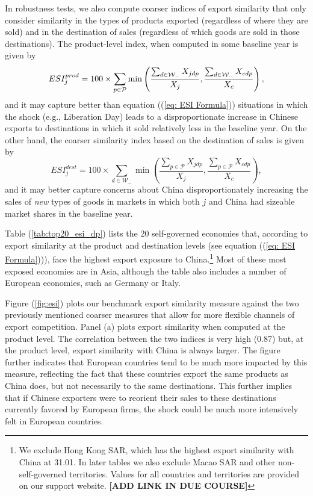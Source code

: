\documentclass[english,12pt]{article}
\theoremstyle{definition}
\let\oldref\ref
\renewcommand{\ref}[1]{(\oldref{#1})}
\begin{document}
In robustness tests, we also compute coarser indices of export similarity
that only consider similarity in the types of products exported (regardless
of where they are sold) and in the destination of sales (regardless of which
goods are sold in those destinations). The product-level index, when
computed in some baseline year is given by%
\begin{equation}
ESI_{j}^{prod}= 100 \times \sum_{p\in \mathcal{P}}\min \left( \frac{\sum_{d\in \mathcal{%
W}_{-}}X_{jdp}}{X_{j}},\frac{\sum_{d\in \mathcal{W}_{-}}X_{cdp}}{X_{c}}%
\right) ,  \label{eq: ESI Formula Product}
\end{equation}%
and it may capture better than equation (\ref{eq: ESI Formula}) situations
in which the shock (e.g., Liberation Day) leads to a disproportionate
increase in Chinese exports to destinations in which it sold relatively less
in the baseline year. On the other hand, the coarser similarity index based
on the destination of sales is given by 
\begin{equation}
ESI_{j}^{dest}= 100 \times \sum_{d\in \mathcal{W}_{-}}\min \left( \frac{\sum_{p\in 
\mathcal{P}}X_{jdp}}{X_{j}},\frac{\sum_{p\in \mathcal{P}}X_{cdp}}{X_{c}}%
\right),  \label{eq: ESI Formula Destination}
\end{equation}%
and it may better capture concerns about China disproportionately increasing
the sales of \emph{new} types of goods in markets in which both $j$ and China had
sizeable market shares in the baseline year.

Table \ref{tab:top20_esi_dp} lists the 20 self-governed economies that, according to
export similarity at the product and destination levels (see equation (\ref%
{eq: ESI Formula})), face the highest export exposure to China.\footnote{We
exclude Hong Kong SAR, which has the highest export similarity with China at 31.01. In
later tables we also exclude Macao SAR and other non-self-governed territories.
Values for all countries and territories are provided on our support website. \textbf{[ADD 
LINK IN DUE COURSE]}} Most of
these most exposed economies are in Asia, although the table also includes a
number of European economies, such as Germany or Italy.

\begin{table}[htbp]
\caption{Top 20 economies by Export Similarity ($ESI_{j}$)}
\label{tab:top20_esi_dp}\centering

\end{table}

Figure \ref{fig:esi} plots our benchmark export similarity measure against
the two previously mentioned coarser measures that allow for more flexible channels of export
competition. Panel (a) plots export similarity when computed at the product
level. The correlation between the two indices is very high (0.87) but, at
the product level, export similarity with China is always larger. The
figure further indicates that European countries tend to be much more
impacted by this measure, reflecting the fact that these countries export
the same products as China does, but not necessarily to the same
destinations. This further implies that if Chinese exporters were to
reorient their sales to these destinations currently favored by European
firms, the shock could be much more intensively felt in European countries.
\end{document}
